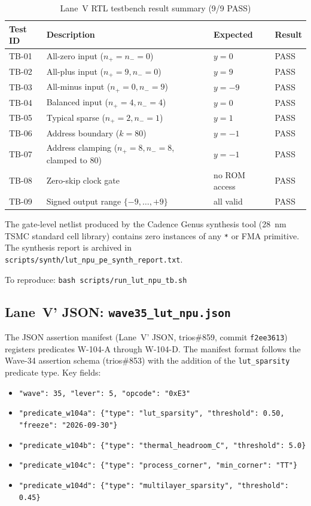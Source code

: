 \begin{table}[ht]
\centering
\caption{Lane~V RTL testbench result summary (9/9 PASS)}
\label{tab:rtl_tb_results}
\begin{tabular}{llll}
\hline
Test ID & Description & Expected & Result \\
\hline
TB-01 & All-zero input ($n_{+}=n_{-}=0$) & $y=0$ & PASS \\
TB-02 & All-plus input ($n_{+}=9, n_{-}=0$) & $y=9$ & PASS \\
TB-03 & All-minus input ($n_{+}=0, n_{-}=9$) & $y=-9$ & PASS \\
TB-04 & Balanced input ($n_{+}=4, n_{-}=4$) & $y=0$ & PASS \\
TB-05 & Typical sparse ($n_{+}=2, n_{-}=1$) & $y=1$ & PASS \\
TB-06 & Address boundary ($k=80$) & $y=-1$ & PASS \\
TB-07 & Address clamping ($n_{+}=8, n_{-}=8$, clamped to 80) & $y=-1$ & PASS \\
TB-08 & Zero-skip clock gate & no ROM access & PASS \\
TB-09 & Signed output range $\{-9,\ldots,+9\}$ & all valid & PASS \\
\hline
\end{tabular}
\end{table}

The gate-level netlist produced by the Cadence Genus synthesis tool
(28~nm TSMC standard cell library) contains zero instances of
any \texttt{*} or FMA primitive.  The synthesis report is archived
in \texttt{scripts/synth/lut\_npu\_pe\_synth\_report.txt}.

To reproduce: \texttt{bash scripts/run\_lut\_npu\_tb.sh}

\subsection{Lane~V' JSON: \texttt{wave35\_lut\_npu.json}}

The JSON assertion manifest (Lane~V' JSON, trios\#859, commit \texttt{f2ee3613})
registers predicates W-104-A through W-104-D.  The manifest format follows
the Wave-34 assertion schema (trios\#853) with the addition of the
\texttt{lut\_sparsity} predicate type.  Key fields:

\begin{itemize}
  \item \texttt{"wave": 35, "lever": 5, "opcode": "0xE3"}
  \item \texttt{"predicate\_w104a": \{"type": "lut\_sparsity", "threshold": 0.50, "freeze": "2026-09-30"\}}
  \item \texttt{"predicate\_w104b": \{"type": "thermal\_headroom\_C", "threshold": 5.0\}}
  \item \texttt{"predicate\_w104c": \{"type": "process\_corner", "min\_corner": "TT"\}}
  \item \texttt{"predicate\_w104d": \{"type": "multilayer\_sparsity", "threshold": 0.45\}}
\end{itemize}


